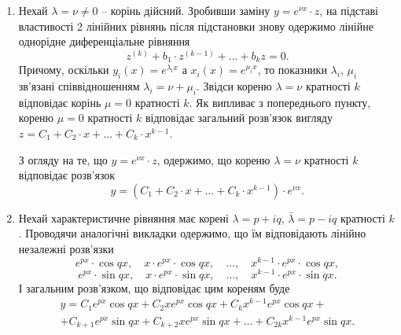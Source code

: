 \begin{enumerate}
\begin{enumerate}
\item Нехай $\lambda = \nu \ne 0$ -- корінь дійсний. Зробивши заміну $y = e^{\nu x} \cdot z$, на підставі властивості 2 лінійних рівнянь після підстановки знову одержимо лінійне однорідне диференціальне рівняння 
\begin{equation*}
	z^{(k)} + b_1 \cdot z^{(k-1)} + \ldots + b_k z = 0.
\end{equation*}
Причому, оскільки $y_i(x) = e^{\lambda_i x}$ а $x_i(x) = e^{\mu_i x}$, то показники $\lambda_i$, $\mu_i$ зв'язані співвідношенням $\lambda_i = \nu + \mu_i$. Звідси кореню $\lambda = \nu$ кратності $k$ відповідає корінь $\mu=0$ кратності $k$. Як випливає з попереднього пункту, кореню $\mu=0$ кратності $k$ відповідає загальний розв'язок вигляду $z = C_1 + C_2 \cdot x + \ldots + C_k \cdot x^{k - 1}$. \parvskip

З огляду на те, що $y = e^{\nu x} \cdot z$, одержимо, що кореню $\lambda=\nu$ кратності $k$ відповідає розв'язок
\begin{equation*}
	y = \left(C_1 + C_2 \cdot x + \ldots + C_k \cdot x^{k - 1} \right) \cdot e^{\nu x}.
\end{equation*}

\item Нехай характеристичне рівняння має корені $\lambda=p+iq$, $\bar\lambda=p-iq$ кратності $k$. Проводячи аналогічні викладки одержимо, що їм відповідають лінійно незалежні розв'язки
\begin{equation*}
	e^{px} \cdot \cos qx, \quad x \cdot e^{px} \cdot \cos qx, \quad \ldots, \quad x^{k-1} \cdot e^{px} \cdot \cos qx,
\end{equation*}
\begin{equation*}
	e^{px} \cdot \sin qx, \quad x \cdot e^{px} \cdot \sin qx, \quad \ldots, \quad x^{k-1} \cdot e^{px} \cdot \sin qx.
\end{equation*}
І загальним розв'язком, що відповідає цим кореням буде
\begin{multline*}
	y = C_1 e^{px} \cos qx + C_2 x e^{px} \cos qx + C_k x^{k-1} e^{px} \cos qx + \\ + C_{k+1} e^{px} \sin qx + C_{k+2} x e^{px} \sin qx + \ldots + C_{2k} x^{k-1} e^{px} \sin qx.
\end{multline*}
\end{enumerate}
\end{enumerate}
